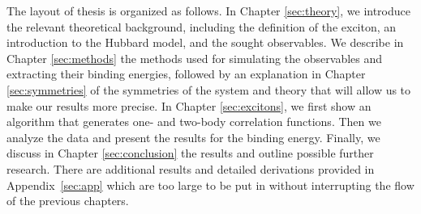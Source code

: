 The layout of thesis is organized as follows. In Chapter \ref{sec:theory}, we introduce the relevant theoretical background, including the definition of the exciton, an introduction to the Hubbard model, and the sought observables. We describe in Chapter \ref{sec:methods} the methods used for simulating the observables and extracting their binding energies, followed by an explanation in Chapter \ref{sec:symmetries} of the symmetries of the system and theory that will allow us to make our results more precise. In Chapter \ref{sec:excitons}, we first show an algorithm that generates one- and two-body correlation functions. Then we analyze the data and present the results for the binding energy. Finally, we discuss in Chapter \ref{sec:conclusion} the results and outline possible further research. There are additional results and detailed derivations provided in Appendix~\ref{sec:app} which are too large to be put in without interrupting the flow of the previous chapters.





